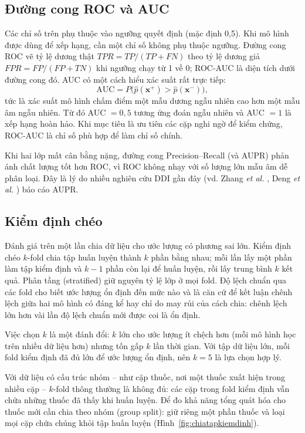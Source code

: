 \documentclass[12pt,a4paper,oneside]{report}
\begin{document}
\subsection{Đường cong ROC và AUC}
Các chỉ số trên phụ thuộc vào ngưỡng quyết định (mặc định 0,5). Khi mô hình được
dùng để xếp hạng, cần một chỉ số không phụ thuộc ngưỡng. Đường cong ROC
vẽ tỷ lệ dương thật $TPR = TP/(TP + FN)$ theo tỷ lệ dương giả
$FPR = FP/(FP + TN)$ khi ngưỡng chạy từ 1 về 0; ROC-AUC là diện tích dưới đường
cong đó. AUC có một cách hiểu xác suất rất trực tiếp:
\begin{equation}
  \text{AUC} = P\big(\hat{p}(\mathbf{x}^{+}) > \hat{p}(\mathbf{x}^{-})\big),
  \label{eq:auc}
\end{equation}
tức là xác suất mô hình chấm điểm một mẫu dương ngẫu nhiên cao hơn một mẫu âm
ngẫu nhiên. Từ đó AUC $= 0{,}5$ tương ứng đoán ngẫu nhiên và AUC $= 1$ là xếp
hạng hoàn hảo. Khi mục tiêu là ưu tiên các cặp nghi ngờ để kiểm chứng, ROC-AUC
là chỉ số phù hợp để làm chỉ số chính.

Khi hai lớp mất cân bằng nặng, đường cong Precision--Recall (và AUPR) phản ánh
chất lượng tốt hơn ROC, vì ROC không nhạy với số lượng lớn mẫu âm dễ phân loại.
Đây là lý do nhiều nghiên cứu DDI gần đây (vd. Zhang \textit{et al.}
\cite{zhang2017}, Deng \textit{et al.} \cite{deng2020}) báo cáo AUPR.

\subsection{Kiểm định chéo}
Đánh giá trên một lần chia dữ liệu cho ước lượng có phương sai lớn.
Kiểm định chéo $k$-fold chia tập huấn luyện thành $k$ phần bằng nhau; mỗi
lần lấy một phần làm tập kiểm định và $k-1$ phần còn lại để huấn luyện, rồi lấy
trung bình $k$ kết quả. Phân tầng (stratified) giữ nguyên tỷ lệ lớp ở mọi
fold. Độ lệch chuẩn qua các fold cho biết ước lượng ổn định đến mức nào và là
căn cứ để kết luận chênh lệch giữa hai mô hình có đáng kể hay chỉ do may rủi của
cách chia: chênh lệch lớn hơn vài lần độ lệch chuẩn mới được coi là ổn định.

Việc chọn $k$ là một đánh đổi: $k$ lớn cho ước lượng ít chệch hơn (mỗi mô hình
học trên nhiều dữ liệu hơn) nhưng tốn gấp $k$ lần thời gian. Với tập dữ liệu lớn,
mỗi fold kiểm định đã đủ lớn để ước lượng ổn định, nên $k = 5$
là lựa chọn hợp lý.

Với dữ liệu có cấu trúc nhóm -- như cặp thuốc, nơi một thuốc xuất hiện trong
nhiều cặp -- $k$-fold thông thường là không đủ: các cặp trong fold kiểm
định vẫn chứa những thuốc đã thấy khi huấn luyện. Để đo khả năng tổng quát hóa
cho thuốc mới cần chia theo nhóm (group split): giữ riêng một phần thuốc
và loại mọi cặp chứa chúng khỏi tập huấn luyện (Hình~\ref{fig:chiatapkiemdinh}).
\end{document}
